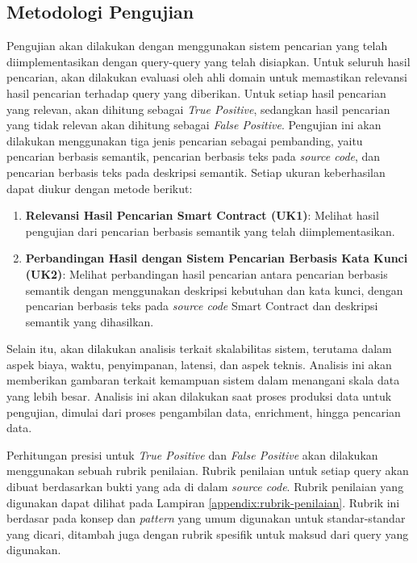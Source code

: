 \subsection{Metodologi Pengujian}

Pengujian akan dilakukan dengan menggunakan sistem pencarian yang telah diimplementasikan dengan query-query yang telah disiapkan. Untuk seluruh hasil pencarian, akan dilakukan evaluasi oleh ahli domain untuk memastikan relevansi hasil pencarian terhadap query yang diberikan. Untuk setiap hasil pencarian yang relevan, akan dihitung sebagai \textit{True Positive}, sedangkan hasil pencarian yang tidak relevan akan dihitung sebagai \textit{False Positive}. Pengujian ini akan dilakukan menggunakan tiga jenis pencarian sebagai pembanding, yaitu pencarian berbasis semantik, pencarian berbasis teks pada \textit{source code}, dan pencarian berbasis teks pada deskripsi semantik. Setiap ukuran keberhasilan dapat diukur dengan metode berikut:

\begin{enumerate}
	\item \textbf{Relevansi Hasil Pencarian Smart Contract (UK1)}: Melihat hasil pengujian dari pencarian berbasis semantik yang telah diimplementasikan.
	\item \textbf{Perbandingan Hasil dengan Sistem Pencarian Berbasis Kata Kunci (UK2)}: Melihat perbandingan hasil pencarian antara pencarian berbasis semantik dengan menggunakan deskripsi kebutuhan dan kata kunci, dengan pencarian berbasis teks pada \textit{source code} Smart Contract dan deskripsi semantik yang dihasilkan.
\end{enumerate}

Selain itu, akan dilakukan analisis terkait skalabilitas sistem, terutama dalam aspek biaya, waktu, penyimpanan, latensi, dan aspek teknis. Analisis ini akan memberikan gambaran terkait kemampuan sistem dalam menangani skala data yang lebih besar. Analisis ini akan dilakukan saat proses produksi data untuk pengujian, dimulai dari proses pengambilan data, enrichment, hingga pencarian data.

Perhitungan presisi untuk \textit{True Positive} dan \textit{False Positive} akan dilakukan menggunakan sebuah rubrik penilaian. Rubrik penilaian untuk setiap query akan dibuat berdasarkan bukti yang ada di dalam \textit{source code}. Rubrik penilaian yang digunakan dapat dilihat pada Lampiran \ref{appendix:rubrik-penilaian}. Rubrik ini berdasar pada konsep dan \textit{pattern} yang umum digunakan untuk standar-standar yang dicari, ditambah juga dengan rubrik spesifik untuk maksud dari query yang digunakan.